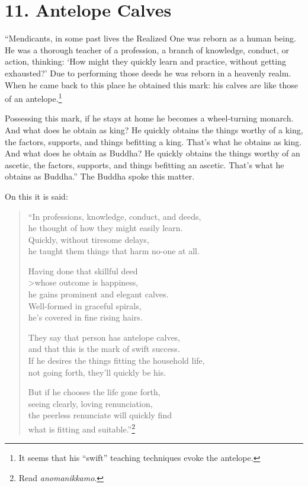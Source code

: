 \documentclass[12pt,openany]{book}%
\begin{document}
\section*{11. Antelope Calves }

“Mendicants, in some past lives the Realized One was reborn as a human being. He was a thorough teacher of a profession, a branch of knowledge, conduct, or action, thinking: ‘How might they quickly learn and practice, without getting exhausted?’ Due to performing those deeds he was reborn in a heavenly realm. When he came back to this place he obtained this mark: his calves are like those of an antelope.\footnote{It seems that his “swift” teaching techniques evoke the antelope. } 

Possessing this mark, if he stays at home he becomes a wheel-turning monarch. And what does he obtain as king? He quickly obtains the things worthy of a king, the factors, supports, and things befitting a king. That’s what he obtains as king. And what does he obtain as Buddha? He quickly obtains the things worthy of an ascetic, the factors, supports, and things befitting an ascetic. That’s what he obtains as Buddha.” The Buddha spoke this matter. 

On this it is said: 

\begin{verse}%
“In professions, knowledge, conduct, and deeds, \\
he thought of how they might easily learn. \\
Quickly, without tiresome delays, \\
he taught them things that harm no-one at all. 

Having done that skillful deed \\>whose outcome is happiness, \\
he gains prominent and elegant calves. \\
Well-formed in graceful spirals, \\
he’s covered in fine rising hairs. 

They say that person has antelope calves, \\
and that this is the mark of swift success. \\
If he desires the things fitting the household life, \\
not going forth, they’ll quickly be his. 

But if he chooses the life gone forth, \\
seeing clearly, loving renunciation, \\
the peerless renunciate will quickly find \\
what is fitting and suitable.”\footnote{Read \textit{anomanikkamo}. } 

%
\end{verse}
\end{document}

